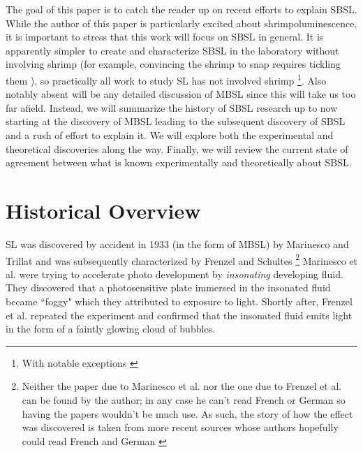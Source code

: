 \documentclass[rmp,aps,nofootinbib,superscriptaddress,floatfix]{revtex4-2}
\begin{document}
The goal of this paper is to catch the reader up on recent efforts to explain SBSL. While the author of this paper is particularly excited about shrimpoluminescence, it is important to stress that this work will focus on SBSL in general. It is apparently simpler to create and characterize SBSL in the laboratory without involving shrimp (for example, convincing the shrimp to snap requires tickling them \cite{lohse2001snapping,versluis2000snapping,lohse2018bubble}), so practically all work to study SL has not involved shrimp \footnote{ With notable exceptions \cite{tang2019bioinspired}}. Also notably absent will be any detailed discussion of MBSL since this will take us too far afield. Instead, we will summarize the history of SBSL research up to now starting at the discovery of MBSL leading to the subsequent discovery of SBSL and a rush of effort to explain it. We will explore both the experimental and theoretical discoveries along the way. Finally, we will review the current state of agreement between what is known experimentally and theoretically about SBSL. 

\section{Historical Overview}

SL was discovered by accident in 1933 (in the form of MBSL) by Marinesco and Trillat \cite{marinesco1933actions} and was subsequently characterized by Frenzel and Schultes \cite{frenzel1934luminescenz} \footnote{Neither the paper due to Marinesco et al. nor the one due to Frenzel et al. can be found by the author; in any case he can't read French or German so having the papers wouldn't be much use. As such, the story of how the effect was discovered is taken from more recent sources whose authors hopefully could read French and German \cite{brenner2002single,gaitan1990experimental,crum1994sonoluminescence}} Marinesco et al. were trying to accelerate photo development by \emph{insonating} developing fluid. They discovered that a photosensitive plate immersed in the insonated fluid became ``foggy" which they attributed to exposure to light. Shortly after, Frenzel et al. repeated the experiment and confirmed that the insonated fluid emits light in the form of a faintly glowing cloud of bubbles. 
\end{document}

